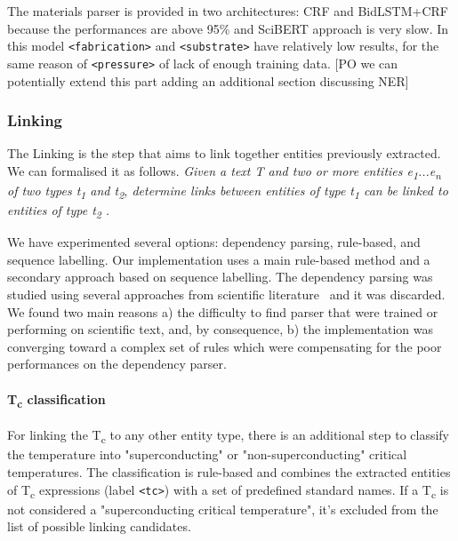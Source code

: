 \documentclass{article}
\begin{document}
The materials parser is provided in two architectures: CRF and BidLSTM+CRF because the performances are above 95\% and SciBERT approach is very slow. 
In this model \texttt{<fabrication>} and \texttt{<substrate>} have relatively low results, for the same reason of \texttt{<pressure>} of lack of enough training data.
[PO we can potentially extend this part adding an additional section discussing NER]

\subsubsection{Linking}

The Linking is the step that aims to link together entities previously extracted.
We can formalised it as follows. \textit{Given a text T and two or more entities e\textsubscript{1}...e\textsubscript{n} of two types t\textsubscript{1} and t\textsubscript{2}, determine links between entities of type t\textsubscript{1} can be linked to entities of type t\textsubscript{2} .} 

We have experimented several options: dependency parsing, rule-based, and sequence labelling. 
Our implementation uses a main rule-based method and a secondary approach based on sequence labelling. The dependency parsing was studied using several approaches from scientific literature~\cite{yoshikawa:2017acl, Tiktinsky2020pyBARTES, swayamdipta:17, zhou-zhao-2019-head} and it was discarded. We found two main reasons a) the difficulty to find parser that were trained or performing on scientific text, and, by consequence, b) the implementation was converging toward a complex set of rules which were compensating for the poor performances on the dependency parser.

\paragraph{T\textsubscript{c} classification}
For linking the T\textsubscript{c} to any other entity type, there is an additional step to classify the temperature into "superconducting" or "non-superconducting" critical temperatures. 
The classification is rule-based and combines the extracted entities of T\textsubscript{c} expressions (label \texttt{<tc>}) with a set of predefined standard names. 
If a T\textsubscript{c} is not considered a "superconducting critical temperature", it's excluded from the list of possible linking candidates. 
\end{document}
